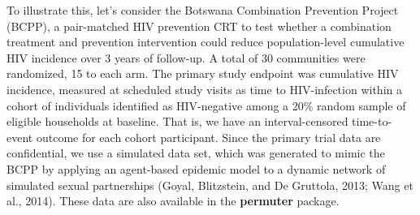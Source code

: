 \documentclass[12pt]{article}\usepackage[]{graphicx}\usepackage[]{color}
\begin{document}
To illustrate this, let's consider the Botswana Combination Prevention Project (BCPP), a pair-matched HIV prevention CRT to test whether a combination treatment and prevention intervention could reduce population-level cumulative HIV incidence over 3 years of follow-up. A total of 30 communities were randomized, 15 to each arm. The primary study endpoint was cumulative HIV incidence, measured at scheduled study visits as time to HIV-infection within a cohort of individuals identified as HIV-negative among a 20\% random sample of eligible households at baseline. That is, we have an interval-censored time-to-event outcome for each cohort participant. Since the primary trial data are confidential, we use a simulated data set, which was generated to mimic the BCPP by applying an agent-based epidemic model to a dynamic network of simulated sexual partnerships (Goyal, Blitzstein, and De Gruttola, 2013; Wang et al., 2014). These data are also available in the \textbf{permuter} package.
\end{document}
